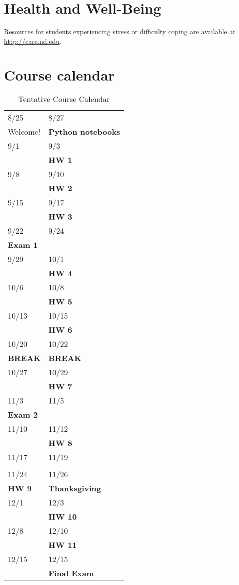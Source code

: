 \documentclass[11pt]{article}
\begin{document}
\section{Health and Well-Being}
\label{sec:orgc6c47e8}
Resources for students experiencing stress or difficulty coping are available at \url{http://care.nd.edu}. 
\section{Course calendar}
\label{sec:orgb8d0288}
\begin{table}[htbp]
\caption{Tentative Course Calendar}
\centering
\begin{tabular}{ll}
\hline
8/25 & 8/27\\
Welcome! & \textbf{Python notebooks}\\
\hline
9/1 & 9/3\\
 & \textbf{HW 1}\\
\hline
9/8 & 9/10\\
 & \textbf{HW 2}\\
\hline
9/15 & 9/17\\
 & \textbf{HW 3}\\
\hline
9/22 & 9/24\\
\textbf{Exam 1} & \\
\hline
9/29 & 10/1\\
 & \textbf{HW 4}\\
\hline
10/6 & 10/8\\
 & \textbf{HW 5}\\
\hline
10/13 & 10/15\\
 & \textbf{HW 6}\\
\hline
10/20 & 10/22\\
\textbf{BREAK} & \textbf{BREAK}\\
\hline
10/27 & 10/29\\
 & \textbf{HW 7}\\
\hline
11/3 & 11/5\\
\textbf{Exam 2} & \\
\hline
11/10 & 11/12\\
 & \textbf{HW 8}\\
\hline
11/17 & 11/19\\
 & \\
\hline
11/24 & 11/26\\
\textbf{HW 9} & \textbf{Thanksgiving}\\
\hline
12/1 & 12/3\\
 & \textbf{HW 10}\\
\hline
12/8 & 12/10\\
 & \textbf{HW 11}\\
\hline
12/15 & 12/15\\
 & \textbf{Final Exam}\\
\hline
\end{tabular}
\end{table}
\end{document}
